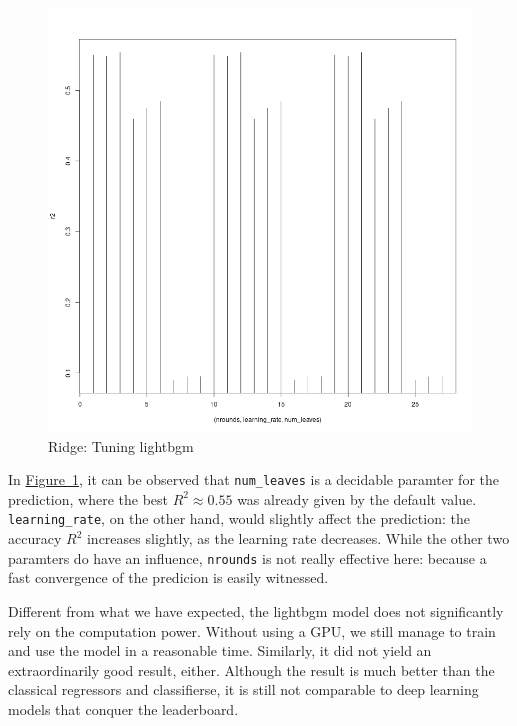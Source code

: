 \documentclass[8pt]{report}
\begin{document}
\begin{figure}[H]
    \centering
    \includegraphics*[scale=0.25]{figures/rsquare_lightbgm.png}
    \caption{Ridge: Tuning lightbgm}
\label{fig:lightbgm}
\end{figure}
In \hyperref[fig:lightbgm]{Figure~\ref*{fig:lightbgm}}, it can be observed that \texttt{num\_leaves} is a decidable 
paramter for the prediction, where the best $R^2 \approx 0.55$ was already given by the default value.
\texttt{learning\_rate}, on the other hand, would slightly affect the prediction: 
the accuracy $R^2$ increases slightly, as the learning rate decreases. While the other two 
paramters do have an influence, \texttt{nrounds} is not really effective here:
because a fast convergence of the predicion is easily witnessed.  

Different from what we have expected, the lightbgm model does not significantly rely on the computation power. 
Without using a GPU, we still manage to train and use the model in a reasonable time. 
Similarly, it did not yield an extraordinarily good result, either. Although the result is much better
than the classical regressors and classifierse, it is still not comparable to deep learning models 
that conquer the leaderboard.
\end{document}

